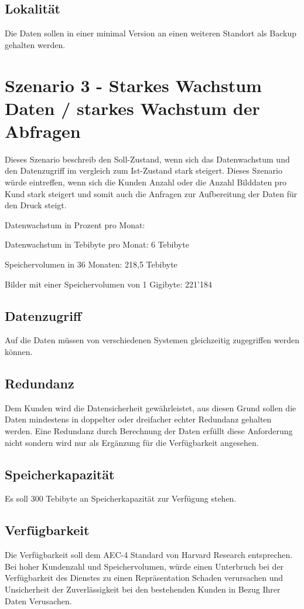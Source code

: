 \subsection{Lokalität}
Die Daten sollen in einer minimal Version an einen weiteren Standort als Backup gehalten werden.

\section{Szenario 3 - Starkes Wachstum Daten / starkes Wachstum der Abfragen}
Dieses Szenario beschreib den Soll-Zustand, wenn sich das Datenwachstum und den Datenzugriff im vergleich zum Ist-Zustand stark steigert. Dieses Szenario würde eintreffen, wenn sich die Kunden Anzahl oder die Anzahl Bilddaten pro Kund stark steigert und somit auch die Anfragen zur Aufbereitung der Daten für den Druck steigt.

Datenwachstum in Prozent pro Monat: 

Datenwachstum in Tebibyte pro Monat: 6 Tebibyte

Speichervolumen in 36 Monaten: 218,5 Tebibyte

Bilder mit einer Speichervolumen von 1 Gigibyte: 221'184

\subsection{Datenzugriff}
Auf die Daten müssen von verschiedenen Systemen gleichzeitig zugegriffen werden können.

\subsection{Redundanz}
Dem Kunden wird die Datensicherheit gewährleistet, aus diesen Grund sollen die Daten mindestens in doppelter oder dreifacher echter Redundanz gehalten werden.  Eine Redundanz durch Berechnung der Daten erfüllt diese Anforderung nicht sondern wird nur als Ergänzung für die Verfügbarkeit angesehen.

\subsection{Speicherkapazität}
Es soll 300 Tebibyte an Speicherkapazität zur Verfügung stehen.

\subsection{Verfügbarkeit}
Die Verfügbarkeit soll dem AEC-4 Standard von Harvard Research entsprechen. Bei hoher Kundenzahl und Speichervolumen, würde einen Unterbruch bei der Verfügbarkeit des Dienstes zu einen Repräsentation Schaden verursachen und Unsicherheit der Zuverlässigkeit bei den bestehenden Kunden in Bezug Ihrer Daten Verusachen.

